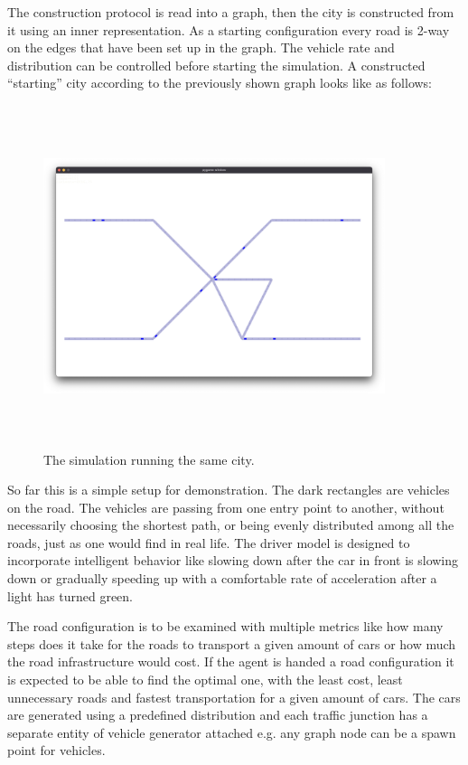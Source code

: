 \documentclass[
]{elteikthesis}[2023/04/10]
\begin{document}
The construction protocol is read into a graph, then the city is constructed
from it using an inner representation. As a starting configuration
every road is 2-way on the edges that have been set up in the graph.
The vehicle rate and distribution can be controlled before starting
the simulation. A constructed ``starting'' city according to the
previously shown graph looks like as follows:
\begin{center}
\begin{figure}[H]
\begin{centering}
\includegraphics[width=10cm,height=10cm,keepaspectratio]{images/simple}
\par\end{centering}
\centering{}\caption{The simulation running the same city. }
\end{figure}
\par\end{center}

So far this is a simple setup for demonstration. The dark rectangles
are vehicles on the road. The vehicles are passing from one entry
point to another, without necessarily choosing the shortest path,
or being evenly distributed among all the roads, just as one would
find in real life. The driver model is designed to incorporate intelligent
behavior like slowing down after the car in front is slowing down
or gradually speeding up with a comfortable rate of acceleration after
a light has turned green. 

The road configuration is to be examined with multiple metrics like how
many steps does it take for the roads to transport a given amount
of cars or how much the road infrastructure would cost. If the agent
is handed a road configuration it is expected to be able to find the
optimal one, with the least cost, least unnecessary roads and fastest
transportation for a given amount of cars. The cars are generated
using a predefined distribution and each traffic junction has a separate
entity of vehicle generator attached e.g. any graph node can be a 
spawn point for vehicles.
\end{document}
